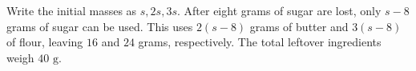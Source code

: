 Write the initial masses as $s,2s,3s$. After eight grams of sugar are lost, only $s-8$ grams of sugar can be used. This uses $2(s-8)$ grams of butter and $3(s-8)$ of flour, leaving $16$ and $24$ grams, respectively. The total leftover ingredients weigh $\boxed{40\text{ g}}$.
